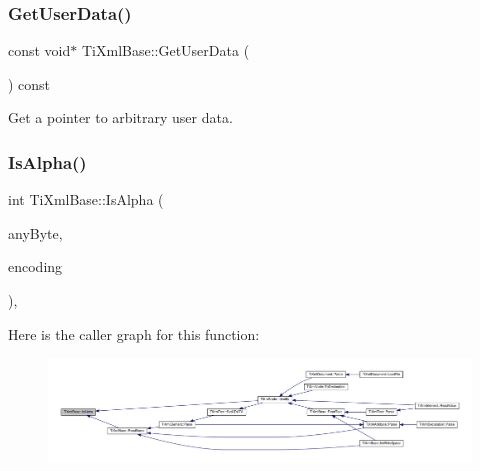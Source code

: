 \subsubsection{\texorpdfstring{Get\+User\+Data()}{GetUserData()}\hspace{0.1cm}{\footnotesize\ttfamily [2/2]}}
{\footnotesize\ttfamily const void$\ast$ Ti\+Xml\+Base\+::\+Get\+User\+Data (\begin{DoxyParamCaption}{ }\end{DoxyParamCaption}) const\hspace{0.3cm}{\ttfamily [inline]}}



Get a pointer to arbitrary user data. 

\mbox{\label{class_ti_xml_base_ae22522b2e8e1ac43102d16394f639fc8}} 
\subsubsection{\texorpdfstring{Is\+Alpha()}{IsAlpha()}}
{\footnotesize\ttfamily int Ti\+Xml\+Base\+::\+Is\+Alpha (\begin{DoxyParamCaption}\item[{unsigned char}]{any\+Byte,  }\item[{\hyperlink{tinyxml_8h_a88d51847a13ee0f4b4d320d03d2c4d96}{Ti\+Xml\+Encoding}}]{encoding }\end{DoxyParamCaption})\hspace{0.3cm}{\ttfamily [static]}, {\ttfamily [protected]}}

Here is the caller graph for this function\+:\nopagebreak
\begin{figure}[H]
\begin{center}
\leavevmode
\includegraphics[width=350pt]{class_ti_xml_base_ae22522b2e8e1ac43102d16394f639fc8_icgraph}
\end{center}
\end{figure}
\mbox{\label{class_ti_xml_base_a321919055c115c78ded17f85a793f368}} 
